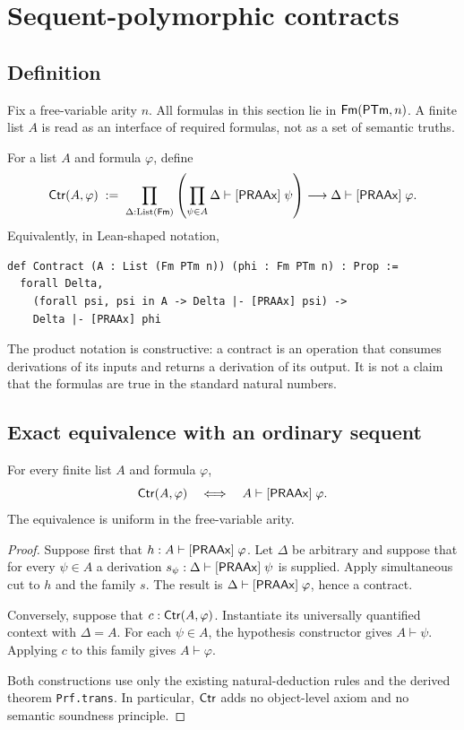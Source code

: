 \section{Sequent-polymorphic contracts}\label{sec:contracts}

\subsection{Definition}

Fix a free-variable arity \(n\).  All formulas in this section lie in \(\mathsf{Fm}(\mathsf{PTm},n)\).  A finite list \(A\) is read as an interface of required formulas, not as a set of semantic truths.

\begin{definition}\label{def:contract}
For a list \(A\) and formula \(\varphi\), define
\[
 \mathsf{Ctr}(A,\varphi)
 \;\mathrel{:=}\;
 \prod_{\Delta:\mathrm{List}(\mathsf{Fm})}
 \left(\prod_{\psi\in A}\Delta\mathrel{\vdash[\mathsf{PRAAx}]}\psi\right)
 \longrightarrow \Delta\mathrel{\vdash[\mathsf{PRAAx}]}\varphi.
\]
Equivalently, in Lean-shaped notation,
\begin{lstlisting}
def Contract (A : List (Fm PTm n)) (phi : Fm PTm n) : Prop :=
  forall Delta,
    (forall psi, psi in A -> Delta |- [PRAAx] psi) ->
    Delta |- [PRAAx] phi
\end{lstlisting}
\end{definition}
The product notation is constructive: a contract is an operation that consumes derivations of its inputs and returns a derivation of its output.  It is not a claim that the formulas are true in the standard natural numbers.

\subsection{Exact equivalence with an ordinary sequent}

\begin{theorem}\label{thm:contract-sequent}
For every finite list \(A\) and formula \(\varphi\),
\[
                  \mathsf{Ctr}(A,\varphi)
                  \quad\Longleftrightarrow\quad
                  A\mathrel{\vdash[\mathsf{PRAAx}]}\varphi.
\]
The equivalence is uniform in the free-variable arity.
\end{theorem}

\begin{proof}
Suppose first that \(h:A\mathrel{\vdash[\mathsf{PRAAx}]}\varphi\).  Let \(\Delta\) be arbitrary and suppose that for every \(\psi\in A\) a derivation \(s_\psi:\Delta\mathrel{\vdash[\mathsf{PRAAx}]}\psi\) is supplied.  Apply simultaneous cut to \(h\) and the family \(s\).  The result is \(\Delta\mathrel{\vdash[\mathsf{PRAAx}]}\varphi\), hence a contract.

Conversely, suppose that \(c:\mathsf{Ctr}(A,\varphi)\).  Instantiate its universally quantified context with \(\Delta=A\).  For each \(\psi\in A\), the hypothesis constructor gives \(A\vdash\psi\).  Applying \(c\) to this family gives \(A\vdash\varphi\).

Both constructions use only the existing natural-deduction rules and the derived theorem \texttt{Prf.trans}.  In particular, \(\mathsf{Ctr}\) adds no object-level axiom and no semantic soundness principle.
\end{proof}

